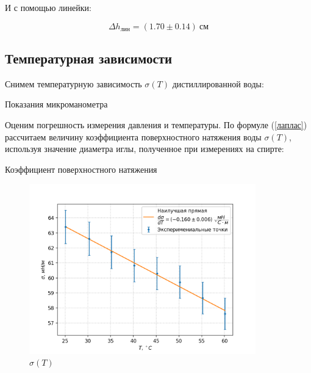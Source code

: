 \documentclass[a4paper,12pt]{article} %
\begin{document}
И с помощью линейки:

\begin{equation}\label{h_лин}
	\Delta h_{лин} = (1.70 \pm 0.14) \ см
\end{equation}

\subsection*{Температурная зависимости}

Снимем температурную зависимость $\sigma(T)$ дистиллированной воды:

\begin{table}[ht!]
	\centering
	
	\caption{Показания микроманометра}
\end{table}

Оценим погрешность измерения давления и температуры. По формуле (\ref{лаплас}) рассчитаем величину коэффициента поверхностного натяжения воды $\sigma(T)$, используя значение диаметра иглы, полученное при измерениях на спирте:

\begin{table}[ht!]
	\centering
	
	\caption{Коэффициент поверхностного натяжения}
\end{table}

\newpage


\begin{figure}[h!]
\begin{center}
\includegraphics[width=0.875\textwidth]{8.png}
\end{center}
\caption{$\sigma(T)$}\label{sigma(T)}
\end{figure}
\end{document}
